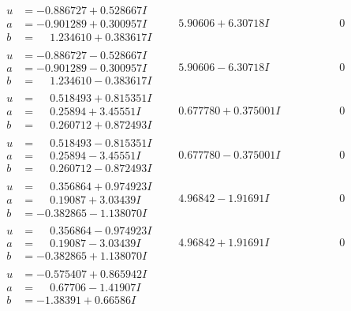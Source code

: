 \documentclass[1p]{elsarticle_modified}
\theoremstyle{definition}
\begin{document}
$$\begin{array}{c|c|c}
\begin{aligned}
u &= -0.886727 + 0.528667 I \\
a &= -0.901289 + 0.300957 I \\
b &= \phantom{-}1.234610 + 0.383617 I\end{aligned}
 & \phantom{-}5.90606 + 6.30718 I & \phantom{-0.000000 } 0 \\ \hline\begin{aligned}
u &= -0.886727 - 0.528667 I \\
a &= -0.901289 - 0.300957 I \\
b &= \phantom{-}1.234610 - 0.383617 I\end{aligned}
 & \phantom{-}5.90606 - 6.30718 I & \phantom{-0.000000 } 0 \\ \hline\begin{aligned}
u &= \phantom{-}0.518493 + 0.815351 I \\
a &= \phantom{-}0.25894 + 3.45551 I \\
b &= \phantom{-}0.260712 + 0.872493 I\end{aligned}
 & \phantom{-}0.677780 + 0.375001 I & \phantom{-0.000000 } 0 \\ \hline\begin{aligned}
u &= \phantom{-}0.518493 - 0.815351 I \\
a &= \phantom{-}0.25894 - 3.45551 I \\
b &= \phantom{-}0.260712 - 0.872493 I\end{aligned}
 & \phantom{-}0.677780 - 0.375001 I & \phantom{-0.000000 } 0 \\ \hline\begin{aligned}
u &= \phantom{-}0.356864 + 0.974923 I \\
a &= \phantom{-}0.19087 + 3.03439 I \\
b &= -0.382865 - 1.138070 I\end{aligned}
 & \phantom{-}4.96842 - 1.91691 I & \phantom{-0.000000 } 0 \\ \hline\begin{aligned}
u &= \phantom{-}0.356864 - 0.974923 I \\
a &= \phantom{-}0.19087 - 3.03439 I \\
b &= -0.382865 + 1.138070 I\end{aligned}
 & \phantom{-}4.96842 + 1.91691 I & \phantom{-0.000000 } 0 \\ \hline\begin{aligned}
u &= -0.575407 + 0.865942 I \\
a &= \phantom{-}0.67706 - 1.41907 I \\
b &= -1.38391 + 0.66586 I\end{aligned}

\end{array}$$
\end{document}
